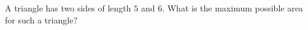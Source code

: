 A triangle has two sides of length $5$ and $6$. What is the maximum possible area for such a triangle?
